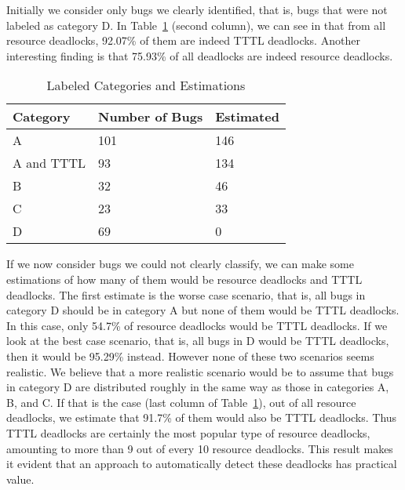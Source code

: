 Initially we  consider only bugs we clearly identified, that is, bugs that were not labeled as category D.
In Table~\ref{tab:categ} (second column), we can see in that from all resource deadlocks, 92.07\% of them are indeed TTTL deadlocks.
Another interesting finding is that 75.93\% of all deadlocks are indeed resource deadlocks.

\begin{table}
\begin{center}
\caption{Labeled Categories and Estimations}\label{tab:categ}
\begin{tabular}{|l|l|l|}
\hline
Category & Number of Bugs & Estimated \\
\hline
A & 101 & 146 \\
A and TTTL & 93 & 134  \\
B & 32 & 46 \\
C & 23 & 33 \\
D & 69 & 0 \\
\hline
\end{tabular}
\end{center}
\end{table}

If we now consider bugs we could not clearly classify, we can make some estimations of how many of them would be resource deadlocks and TTTL deadlocks. The first estimate is the worse case scenario, that is, all bugs in category D should be in category A but none of them would be TTTL deadlocks. In this case, only 54.7\% of resource deadlocks would be TTTL deadlocks. If we look at the best case scenario, that is, all bugs in D would be TTTL deadlocks, then it would be 95.29\% instead. However none of these two scenarios seems realistic. We believe that a more realistic scenario would be to assume that bugs in category D are distributed roughly in the same way as those in categories A, B, and C. If that is the case (last column of Table~\ref{tab:categ}), out of all resource deadlocks, we estimate that 91.7\% of them would also be TTTL deadlocks. Thus TTTL deadlocks are certainly the most popular type of resource deadlocks, amounting to more than 9 out of every 10 resource deadlocks. This result makes it evident that an approach to automatically detect these deadlocks has practical value.  


